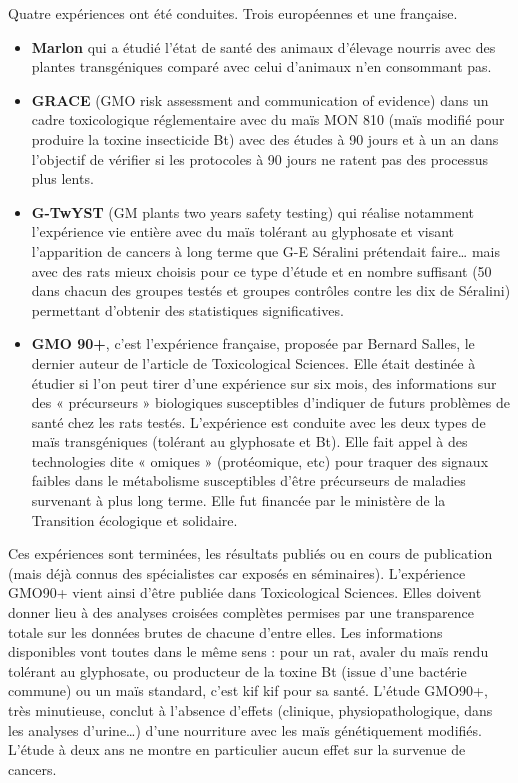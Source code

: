 \documentclass[8pt]{article}
\begin{document}
Quatre expériences ont été conduites. Trois européennes et une française.
\begin{itemize}
	\item \textbf{Marlon} qui a étudié l’état de santé des animaux d’élevage nourris avec des plantes transgéniques comparé avec celui d’animaux n’en consommant pas.
	\item \textbf{GRACE} (GMO risk assessment and communication of evidence) dans un cadre toxicologique réglementaire avec du maïs MON 810 (maïs modifié pour produire la toxine insecticide Bt) avec des études à 90 jours et à un an dans l’objectif de vérifier si les protocoles à 90 jours ne ratent pas des processus plus lents.
	\item \textbf{G-TwYST} (GM plants two years safety testing) qui réalise notamment l’expérience vie entière avec du maïs tolérant au glyphosate et visant l’apparition de cancers à long terme que G-E Séralini prétendait faire… mais avec des rats mieux choisis pour ce type d’étude et en nombre suffisant (50 dans chacun des groupes testés et groupes contrôles contre les dix de Séralini) permettant d’obtenir des statistiques significatives.
	\item \textbf{GMO 90+}, c’est l’expérience française, proposée par Bernard Salles, le dernier auteur de l’article de Toxicological Sciences. Elle était destinée à étudier si l’on peut tirer d’une expérience sur six mois, des informations sur des « précurseurs » biologiques susceptibles d’indiquer de futurs problèmes de santé chez les rats testés. L’expérience est conduite avec les deux types de maïs transgéniques (tolérant au glyphosate et Bt). Elle fait appel à des technologies dite « omiques » (protéomique, etc) pour traquer des signaux faibles dans le métabolisme susceptibles d’être précurseurs de maladies survenant à plus long terme. Elle fut financée par le ministère de la Transition écologique et solidaire.
\end{itemize}


Ces expériences sont terminées, les résultats publiés ou en cours de publication (mais déjà connus des spécialistes car exposés en séminaires). L’expérience GMO90+ vient ainsi d’être publiée dans Toxicological Sciences. Elles doivent donner lieu à des analyses croisées complètes permises par une transparence totale sur les données brutes de chacune d’entre elles. Les informations disponibles vont toutes dans le même sens : pour un rat, avaler du maïs rendu tolérant au glyphosate, ou producteur de la toxine Bt (issue d’une bactérie commune) ou un maïs standard, c’est kif kif pour sa santé. L’étude GMO90+, très minutieuse, conclut à l’absence d’effets (clinique, physiopathologique, dans les analyses d’urine…) d’une nourriture avec les maïs génétiquement modifiés. L’étude à deux ans ne montre en particulier aucun effet sur la survenue de cancers.\\
\end{document}
